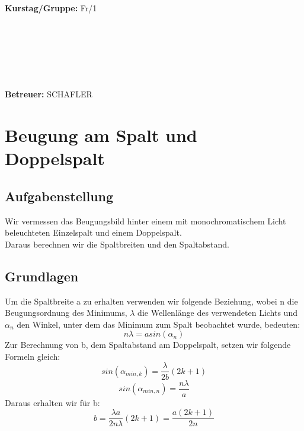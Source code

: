 \documentclass{article}
\begin{document}
\begin{verbatim}


\end{verbatim}
			\begin{flushleft}
			\textbf{\Large{Kurstag/Gruppe:}} \Large{Fr/1}
			\end{flushleft}

\begin{verbatim}






\end{verbatim}
			\begin{flushleft}
			\LARGE{\textbf{Betreuer:}}	\Large{SCHAFLER}	
			\end{flushleft}
\newpage	

\section{Beugung am Spalt und Doppelspalt}

\subsection{Aufgabenstellung}
Wir vermessen das Beugungsbild hinter einem mit monochromatischem Licht  beleuchteten Einzelspalt und einem Doppelspalt. \\
Daraus berechnen wir die Spaltbreiten und den Spaltabstand.
\subsection{Grundlagen}
Um die Spaltbreite a zu erhalten verwenden wir folgende Beziehung, wobei n die Beugungsordnung des Minimums, $\lambda$ die Wellenlänge des verwendeten Lichts und $\alpha_n$ den Winkel, unter dem das Minimum zum Spalt beobachtet wurde, bedeuten:
\begin{equation}
\label{spaltbreite}
n\lambda=a sin(\alpha_n)
\end{equation}
Zur Berechnung von b, dem Spaltabstand am Doppelspalt, setzen wir folgende Formeln gleich:\\
$$sin(\alpha_{min,k})=\frac{\lambda}{2b}(2k+1)$$
$$sin(\alpha_{min,n})=\frac{n\lambda}{a}$$
Daraus erhalten wir für b:
\begin{equation}
\label{spaltabstand}
b=\frac{\lambda a}{2n\lambda}(2k+1)=\frac{a(2k+1)}{2n}
\end{equation}
\end{document}
